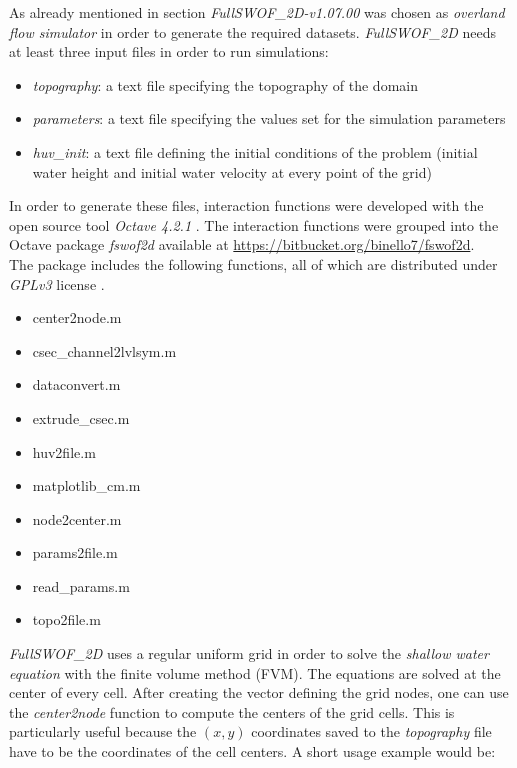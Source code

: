 As already mentioned in section  \textit{FullSWOF\_2D-v1.07.00} was chosen as \emph{overland flow simulator} in order to generate the required datasets.
\textit{FullSWOF\_2D} needs at least three input files in order to run simulations:

\begin{itemize}
\itemsep0em
  \item \textit{topography}: a text file specifying the topography of the domain
  \item \textit{parameters}: a text file specifying the values set for the simulation parameters
  \item \textit{huv\_init}: a text file defining the initial conditions of the problem (initial water height and initial water velocity at every point of the grid)
\end{itemize}

In order to generate these files, interaction functions were developed with the open source tool \textit{Octave 4.2.1} \autocite{octave_community_gnu_2018}.
The interaction functions were grouped into the Octave package \textit{fswof2d} available at \url{https://bitbucket.org/binello7/fswof2d}.\\

The package includes the following functions, all of which are distributed under \textit {GPLv3} license \autocite{smith_quick_2014}.

\begin{itemize}
\itemsep0em
  \item center2node.m
  \item csec\_channel2lvlsym.m
  \item dataconvert.m
  \item extrude\_csec.m
  \item huv2file.m
  \item matplotlib\_cm.m
  \item node2center.m
  \item params2file.m
  \item read\_params.m
  \item topo2file.m
\end{itemize}



\textit{FullSWOF\_2D} uses a regular uniform grid in order to solve the \emph{shallow water equation} with the finite volume method (FVM).
The equations are solved at the center of every cell.
After creating the vector defining the grid nodes, one can use the \textit{center2node} function to compute the centers of the grid cells.
This is particularly useful because the $(x,y)$ coordinates saved to the \textit{topography} file have to be the coordinates of the cell centers.
A short usage example would be:







